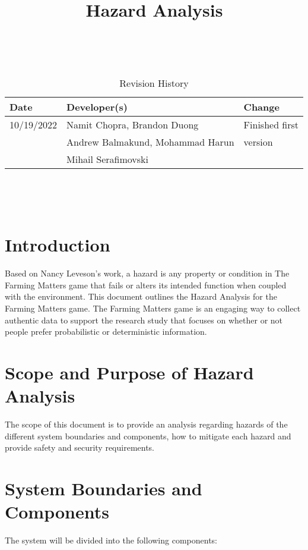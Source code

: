 \documentclass{article}
\title{Hazard Analysis\\\progname}
\author{\authname}
\date{}
\begin{document}
\maketitle
\thispagestyle{empty}

~\newpage



\begin{table}[hp]
\caption{Revision History} \label{TblRevisionHistory}
\begin{tabularx}{\textwidth}{llX}
\toprule
\textbf{Date} & \textbf{Developer(s)} & \textbf{Change}\\
\midrule
10/19/2022 & Namit Chopra, Brandon Duong  & Finished first \\
 & Andrew Balmakund, Mohammad Harun & version\\
 & Mihail Serafimovski & \\
\bottomrule
\end{tabularx}
\end{table}

~\newpage

\tableofcontents
\listoftables
~\newpage



\section{Introduction}
Based on Nancy Leveson's work, a hazard is any property or condition in The Farming Matters game that fails or alters its intended function when coupled with the environment. This document outlines the Hazard Analysis for the Farming Matters game. The Farming Matters game is an engaging way to collect authentic data to support the research study that focuses on whether or not people prefer probabilistic or deterministic information.


\section{Scope and Purpose of Hazard Analysis}
The scope of this document is to provide an analysis regarding hazards of the different system boundaries and components, how to mitigate each hazard and provide safety and security requirements.

\section{System Boundaries and Components}
The system will be divided into the following components:
\end{document}
